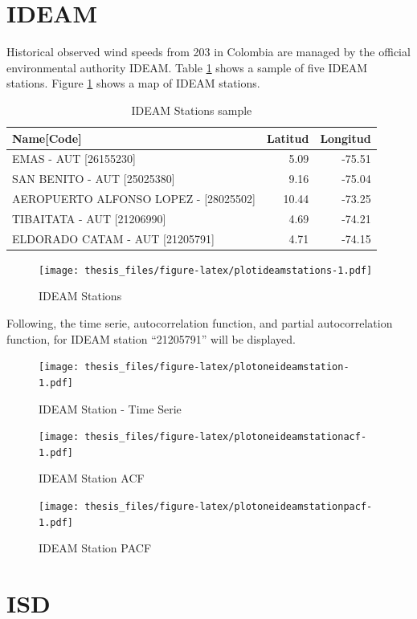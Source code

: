 \documentclass[12pt,oneside]{reedthesis}
\begin{document}
\hypertarget{ideam}{%
\section{IDEAM}\label{ideam}}

Historical observed wind speeds from 203 in Colombia are managed by the official environmental authority IDEAM. Table \ref{tab:tableideamstations} shows a sample of five IDEAM stations. Figure \ref{fig:plotideamstations} shows a map of IDEAM stations.
\begin{longtable}[t]{lrr}
\caption[IDEAM Stations]{\label{tab:tableideamstations}IDEAM Stations sample}\\
\toprule
Name[Code] & Latitud & Longitud\\
\midrule
EMAS - AUT [26155230] & 5.09 & -75.51\\
SAN BENITO - AUT [25025380] & 9.16 & -75.04\\
AEROPUERTO ALFONSO LOPEZ - [28025502] & 10.44 & -73.25\\
TIBAITATA - AUT [21206990] & 4.69 & -74.21\\
ELDORADO CATAM - AUT [21205791] & 4.71 & -74.15\\
\bottomrule
\end{longtable}
\begin{figure}
\centering
\texttt{[image: thesis\_files/figure-latex/plotideamstations-1.pdf]}
\caption{\label{fig:plotideamstations}IDEAM Stations}
\end{figure}
Following, the time serie, autocorrelation function, and partial autocorrelation function, for IDEAM station ``21205791'' will be displayed.
\begin{figure}
\centering
\texttt{[image: thesis\_files/figure-latex/plotoneideamstation-1.pdf]}
\caption{\label{fig:plotoneideamstation}IDEAM Station - Time Serie}
\end{figure}
\begin{figure}
\centering
\texttt{[image: thesis\_files/figure-latex/plotoneideamstationacf-1.pdf]}
\caption{\label{fig:plotoneideamstationacf}IDEAM Station ACF}
\end{figure}
\begin{figure}
\centering
\texttt{[image: thesis\_files/figure-latex/plotoneideamstationpacf-1.pdf]}
\caption{\label{fig:plotoneideamstationpacf}IDEAM Station PACF}
\end{figure}
\hypertarget{isd}{%
\section{ISD}\label{isd}}
\end{document}
